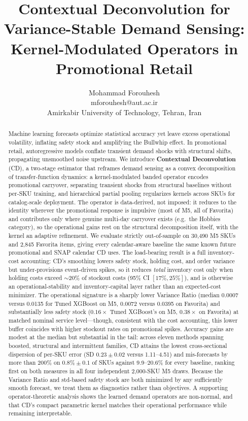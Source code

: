 \documentclass[10pt]{article} %
\title{Contextual Deconvolution for Variance-Stable Demand Sensing:\\
Kernel-Modulated Operators in Promotional Retail}
\author{\name Mohammad Forouhesh \\ \email mforouhesh@aut.ac.ir \\
      \addr Amirkabir University of Technology, Tehran, Iran}
\theoremstyle{plain}
\theoremstyle{definition}
\begin{document}
\maketitle


\begin{abstract}
Machine learning forecasts optimize statistical accuracy yet leave excess operational volatility, inflating safety stock and amplifying the Bullwhip effect. In promotional retail, autoregressive models conflate transient demand shocks with structural shifts, propagating unsmoothed noise upstream. We introduce \textbf{Contextual Deconvolution} (CD), a two-stage estimator that reframes demand sensing as a convex decomposition of transfer-function dynamics: a kernel-modulated banded operator encodes promotional carryover, separating transient shocks from structural baselines without per-SKU training, and hierarchical partial pooling regularizes kernels across SKUs for catalog-scale deployment. The operator is data-derived, not imposed: it reduces to the identity wherever the promotional response is impulsive (most of M5, all of Favorita) and contributes only where genuine multi-day carryover exists (e.g.\ the Hobbies category), so the operational gains rest on the structural decomposition itself, with the kernel an adaptive refinement. We evaluate strictly out-of-sample on 30,490 M5 SKUs and 2,845 Favorita items, giving every calendar-aware baseline the same known future promotional and SNAP calendar CD uses. The load-bearing result is a full inventory-cost accounting: CD's smoothing lowers safety stock, holding cost, and order variance but under-provisions event-driven spikes, so it reduces \emph{total} inventory cost only when holding costs exceed $\sim$20\% of stockout costs (95\% CI $[17\%, 25\%]$), and is otherwise an operational-stability and inventory-capital layer rather than an expected-cost minimizer. The operational signature is a sharply lower Variance Ratio (median 0.0007 versus 0.0135 for Tuned XGBoost on M5, 0.0072 versus 0.0395 on Favorita) and substantially less safety stock ($0.16\times$ Tuned XGBoost's on M5, $0.38\times$ on Favorita) at matched nominal service level---though, consistent with the cost accounting, this lower buffer coincides with higher stockout rates on promotional spikes. Accuracy gains are modest at the median but substantial in the tail: across eleven methods spanning boosted, structural and intermittent families, CD attains the lowest cross-sectional dispersion of per-SKU error (SD $0.23\pm0.02$ versus 1.11--4.51) and mis-forecasts by more than 200\% on $0.8\%\pm0.1$ of SKUs against 9.9--20.6\% for every baseline, ranking first on both measures in all four independent 2{,}000-SKU M5 draws. Because the Variance Ratio and std-based safety stock are both minimized by any sufficiently smooth forecast, we treat them as diagnostics rather than objectives. A supporting operator-theoretic analysis shows the learned demand operators are non-normal, and that CD's compact parametric kernel matches their operational performance while remaining interpretable.
\end{abstract}
\end{document}
